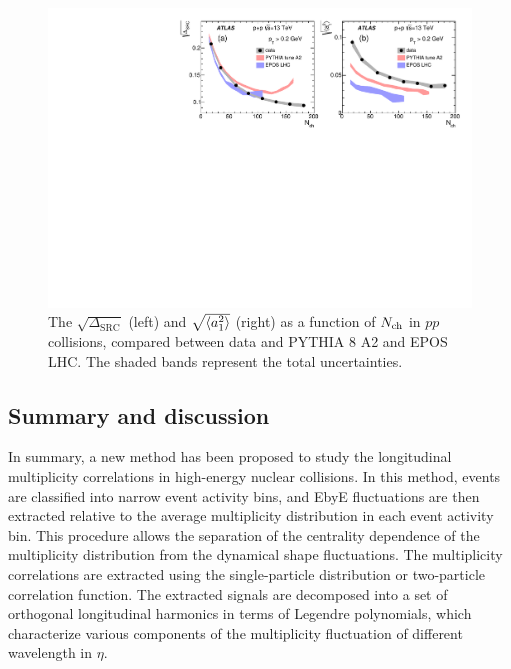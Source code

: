 \begin{figure}[H]
\centering
\includegraphics[width=.95\linewidth]{figs/chapter_fbcorr/ATLAS_SRC_LRC_modelComp.pdf}
\caption{The $\sqrt{\Delta_\text{SRC}}$ (left) and $\sqrt{\left\langle a_1^2\right\rangle}$ (right) as a function of $N_\text{ch}$ in $pp$ collisions, compared between data and PYTHIA 8 A2 and EPOS LHC. The shaded bands represent the total uncertainties.}
\label{fig:fbcorr_ATLAS_SRC_LRC_modelComp}
\end{figure}



\subsection{Summary and discussion}

In summary, a new method has been proposed to study the longitudinal multiplicity correlations in high-energy nuclear collisions. In this method, events are classified into narrow event activity bins, and EbyE fluctuations are then extracted relative to the average multiplicity distribution in each event activity bin. This procedure allows the separation of the centrality dependence of the multiplicity distribution from the dynamical shape fluctuations. The multiplicity correlations are extracted using the single-particle distribution or two-particle correlation function. The extracted signals are decomposed into a set of orthogonal longitudinal harmonics in terms of Legendre polynomials, which characterize various components of the multiplicity fluctuation of different wavelength in $\eta$.

